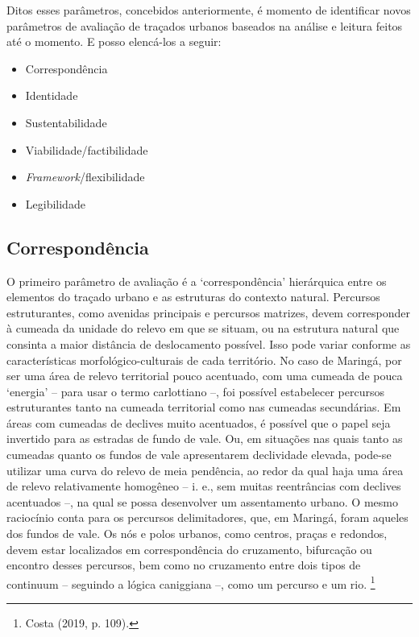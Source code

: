 \documentclass[12pt, a4paper]{book} %
\begin{document}
        Ditos esses parâmetros, concebidos anteriormente, é momento de identificar novos parâmetros de avaliação de traçados urbanos baseados na análise e leitura feitos até o momento. E posso elencá-los a seguir:

        \begin{itemize}
            \item Correspondência
            \item Identidade
            \item Sustentabilidade
            \item Viabilidade/factibilidade
            \item \textit{Framework}/flexibilidade
            \item Legibilidade
        \end{itemize}

                \subsection*{Correspondência}

        O primeiro parâmetro de avaliação é a ‘correspondência’ hierárquica entre os elementos do traçado urbano e as estruturas do contexto natural. Percursos estruturantes, como avenidas principais e percursos matrizes, devem corresponder à cumeada da unidade do relevo em que se situam, ou na estrutura natural que consinta a maior distância de deslocamento possível. Isso pode variar conforme as características morfológico-culturais de cada território. No caso de Maringá, por ser uma área de relevo territorial pouco acentuado, com uma cumeada de pouca ‘energia’ – para usar o termo carlottiano –, foi possível estabelecer percursos estruturantes tanto na cumeada territorial como nas cumeadas secundárias. Em áreas com cumeadas de declives muito acentuados, é possível que o papel seja invertido para as estradas de fundo de vale. Ou, em situações nas quais tanto as cumeadas quanto os fundos de vale apresentarem declividade elevada, pode-se utilizar uma curva do relevo de meia pendência, ao redor da qual haja uma área de relevo relativamente homogêneo – i. e., sem muitas reentrâncias com declives acentuados –, na qual se possa desenvolver um assentamento urbano. O mesmo raciocínio conta para os percursos delimitadores, que, em Maringá, foram aqueles dos fundos de vale. Os nós e polos urbanos, como centros, praças e redondos, devem estar localizados em correspondência do cruzamento, bifurcação ou encontro desses percursos, bem como no cruzamento entre dois tipos de continuum – seguindo a lógica caniggiana –, como um percurso e um rio. \footnote[105]{Costa (2019, p. 109).}
\end{document}
